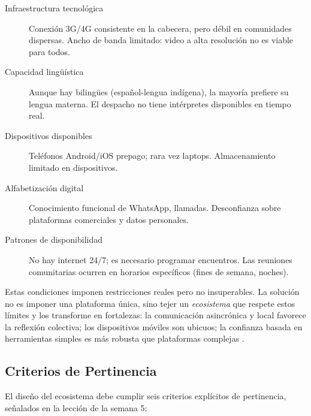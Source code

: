﻿\documentclass[
  spanish,
  letterpaper, oneside
]{article}
\begin{document}
\begin{description}
  \item[Infraestructura tecnológica] Conexión 3G/4G consistente en la cabecera, pero 
  débil en comunidades dispersas. Ancho de banda limitado: video a alta resolución no es viable 
  para todos.
  
  \item[Capacidad lingüística] Aunque hay bilingües (español-lengua indígena), la mayoría 
  prefiere su lengua materna. El despacho no tiene intérpretes disponibles en tiempo real.
  
  \item[Dispositivos disponibles] Teléfonos Android/iOS prepago; rara vez laptops. 
  Almacenamiento limitado en dispositivos.
  
  \item[Alfabetización digital] Conocimiento funcional de WhatsApp, llamadas. 
  Desconfianza sobre plataformas comerciales y datos personales.
  
  \item[Patrones de disponibilidad] No hay internet 24/7; es necesario programar encuentros. 
  Las reuniones comunitarias ocurren en horarios específicos (fines de semana, noches).
\end{description}

Estas condiciones imponen restricciones reales pero no insuperables. La solución no es 
imponer una plataforma única, sino tejer un \textit{ecosistema} que respete estos límites 
y los transforme en fortalezas: la comunicación asincrónica y local favorece la reflexión 
colectiva; los dispositivos móviles son ubicuos; la confianza basada en herramientas 
simples es más robusta que plataformas complejas \cite{cushpa2022pacie}.

\subsection{Criterios de Pertinencia}

El diseño del ecosistema debe cumplir seis criterios explícitos de pertinencia, señalados 
en la lección de la semana 5:
\end{document}
